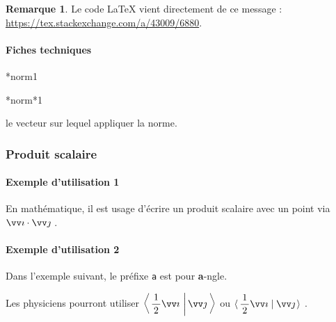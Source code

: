 \documentclass[12pt,a4paper]{scrartcl}
\makeatletter
\theoremstyle{definition}
\newtheorem*{remark}{Remarque}
\newcommand\IDmacro{\@ifstar{\@IDmacro@star}{\@IDmacro@no@star}}
\newcommand\@IDmacro@no@star[3]{%
    \texttt{%
    	\textbackslash#1%
    	\IfStrEq{#2}{0}{}{%
    		\,\,[#2 Option%
				\IfStrEq{#2}{1}{}{s}]%
			}%
	    \IfStrEq{#3}{}{}{%
	    		\,\,(#3 Argument%
				\IfStrEq{#3}{1}{}{s})%
			}
	   	}
    \immediate\write\tempfile{macro,#1,#2,#3}%
}
\newcommand\@IDmacro@star[2]{%
    \@IDmacro@no@star{#1}{0}{#2}%
}
\newcommand\@IDoptarg{\@ifstar{\@IDoptarg@star}{\@IDoptarg@no@star}}
\newcommand\@IDoptarg@star[2]{%
	\vspace{0.5em}
	\textbf{---} \texttt{#1%
		\IfStrEq{#2}{}{:}{\,#2:}%
	}%
}
\newcommand\@IDoptarg@no@star[2]{%
	\IfStrEq{#2}{}{%
		\@IDoptarg@star{#1}{}%
	}{%
		\@IDoptarg@star{#1}{#2}%
	}%
}
\newcommand\IDarg[1]{%
	\@IDoptarg{Argument}{#1}%
}
\makeatother
\begin{document}
\begin{remark}
	Le code \LaTeX{} vient directement de ce message : \url{https://tex.stackexchange.com/a/43009/6880}.
\end{remark}


            \paragraph{Fiches techniques}

\IDmacro*{norm}{1}

\IDmacro*{norm*}{1}

\IDarg{} le vecteur sur lequel appliquer la norme.






		\subsubsection{Produit scalaire}

            \paragraph{Exemple d'utilisation 1}

\begin{tcblisting}{}
En mathématique, il est usage d'écrire un produit scalaire avec un point via
$\dotprod{\vect{i}}{\vect{j}}$ .
\end{tcblisting}


            \paragraph{Exemple d'utilisation 2}

Dans l'exemple suivant, le préfixe \verb+a+ est pour \textbf{a}-ngle.

\begin{tcblisting}{}
Les physiciens pourront utiliser
$\displaystyle \adotprod{\frac{1}{2} \vect{i}}{\vect{j}}$
ou
$\displaystyle \adotprod*{\frac{1}{2} \vect{i}}{\vect{j}}$ .
\end{tcblisting}
\end{document}
